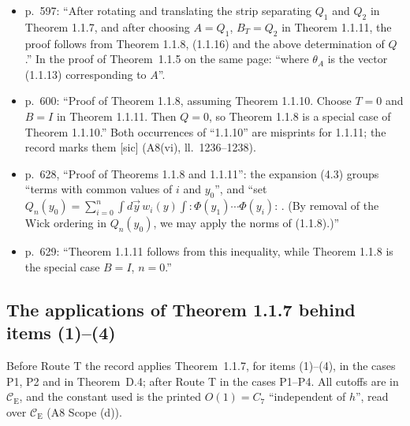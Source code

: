 \documentclass[11pt,a4paper]{article}
\newcommand{\CE}{\mathcal{C}_{\mathrm E}}
\theoremstyle{plain}
\theoremstyle{definition}
\begin{document}
\begin{itemize}
write $Q(t)$ in place of $Q(x_0)$.''  Theorem~1.1.10 then names an approximant
``$Q(T)=\alpha(T)+\int\Phi(0,\vec x)h_T(\vec x)d\vec x$'', and Theorem~1.1.11 ``$n$\textsuperscript{th}
degree polynomials $Q_n(t_j)$ of the form (1.1.5) with $r=1$'' with the bound ``(1.1.16)
$|\int(A-Q)B_Tdq_h|\le O(1)\|A\|\,\|B\|e^{-\gamma T}$, uniformly in $h$''.  The proof of
Corollary~1.1.9 on the same page writes ``Apply the theorem to
$Q_1=Q(x_{i0}-x_{10})Q(x_{10}-x_{i0})^-$, where $Q$ has the form (1.1.5)''; that ``the theorem''
is Theorem~1.1.8 is a reading, supported by the form of the bound that follows,
$\int Q_1dq\le O(1)\|Q_1\|_{K_2}$.
\item p.~597: ``After rotating and translating the strip separating $Q_1$ and $Q_2$ in Theorem
1.1.7, and after choosing $A=Q_1$, $B_T=Q_2$ in Theorem 1.1.11, the proof follows from Theorem
1.1.8, (1.1.16) and the above determination of $Q$.''  In the proof of Theorem~1.1.5 on the same
page: ``where $\theta_A$ is the vector (1.1.13) corresponding to $A$''.
\item p.~600: ``Proof of Theorem 1.1.8, assuming Theorem 1.1.10.  Choose $T=0$ and $B=I$ in
Theorem 1.1.11.  Then $Q=0$, so Theorem 1.1.8 is a special case of Theorem 1.1.10.''  Both
occurrences of ``1.1.10'' are misprints for 1.1.11; the record marks them [sic] (A8(vi),
ll.~1236--1238).
\item p.~628, ``Proof of Theorems 1.1.8 and 1.1.11'': the expansion (4.3) groups ``terms with
common values of $i$ and $y_0$'', and ``set $Q_n(y_0)=\sum_{i=0}^n\int d\vec y\,w_i(y)\int
{:}\Phi(y_1)\cdots\Phi(y_i){:}$\,.  (By removal of the Wick ordering in $Q_n(y_0)$, we may apply
the norms of (1.1.8).)''
\item p.~629: ``Theorem 1.1.11 follows from this inequality, while Theorem 1.1.8 is the special
case $B=I$, $n=0$.''
\end{itemize}

\subsection{The applications of Theorem 1.1.7 behind items (1)--(4)}\label{sec:cases}

Before Route T the record applies Theorem~1.1.7, for items (1)--(4), in the cases P1, P2 and in
Theorem~D.4; after Route T in the cases P1--P4.  All cutoffs are in $\CE$, and the constant used
is the printed $O(1)=C_7$ ``independent of $h$'', read over $\CE$ (A8 Scope (d)).
\end{document}
